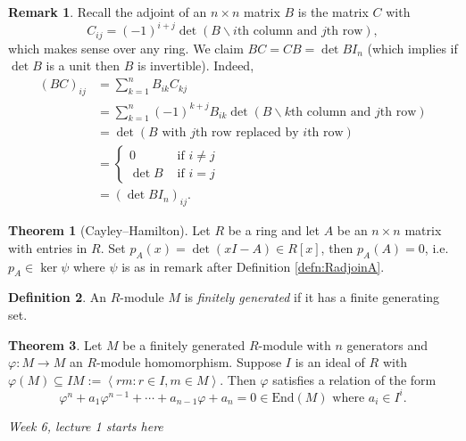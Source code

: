 \documentclass[a4paper]{article}
\newcommand{\la}{\left\langle}
\newcommand{\ra}{\right\rangle}
\newcommand{\End}{\text{End}}
\theoremstyle{definition}
\newtheorem{defn}{Definition}[subsection]
\newtheorem{thm}[defn]{Theorem}
\newtheorem*{remark}{Remark}
\begin{document}
\begin{remark}
Recall the adjoint of an $n\times n$ matrix $B$ is the matrix $C$ with 
\[
C_{ij}=(-1)^{i+j} \det \left(B\backslash i\text{th column and }j\text{th row} \right),
\]
which makes sense over any ring. We claim $BC=CB=\det B I_n$ (which implies if $\det B$ is a unit then $B$ is invertible). Indeed,
\[
\begin{aligned}
(BC)_{ij} &= \sum_{k=1}^n B_{ik} C_{kj}\\
&=\sum_{k=1}^n (-1)^{k+j} B_{ik} \det \left(B\backslash k\text{th column and }j\text{th row} \right)\\
&=\det \left(B\text{ with }j\text{th row replaced by }i\text{th row}\right)\\
&=\left\{ \begin{aligned}
  0 &\text{ if } i\neq j\\ \det B &\text{ if } i= j
\end{aligned} \right. \\
&=\left(\det B I_n\right)_{ij}.
\end{aligned}
\]
\end{remark}

\begin{thm}[Cayley–Hamilton]
Let $R$ be a ring and let $A$ be an $n\times n$ matrix with entries in $R$. Set $p_A(x)=\det (xI-A)\in R[x]$, then $p_A(A)=0$, i.e. $p_A\in\ker\psi$ where $\psi$ is as in remark after Definition \ref{defn:RadjoinA}.
\end{thm}

\begin{defn}
An $R$-module $M$ is \textit{finitely generated} if it has a finite generating set.
\end{defn}

\begin{thm}
\label{thm:generalCH}
Let $M$ be a finitely generated $R$-module with $n$ generators and $\varphi:M\rightarrow M$ an $R$-module homomorphism. Suppose $I$ is an ideal of $R$ with $\varphi(M)\subseteq IM:=\la rm:r\in I,m\in M\ra$. Then $\varphi$ satisfies a relation of the form
\[
\varphi^n + a_1 \varphi^{n-1} + \cdots + a_{n-1}\varphi + a_n=0 \in\End(M) \text{ where } a_i\in I^i.
\]
\end{thm}

\begin{flushright}
\textit{Week 6, lecture 1 starts here}
\end{flushright}
\end{document}

